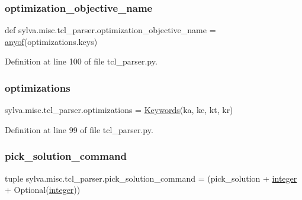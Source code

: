 \subsubsection{\texorpdfstring{optimization\+\_\+objective\+\_\+name}{optimization\_objective\_name}}
{\footnotesize\ttfamily def sylva.\+misc.\+tcl\+\_\+parser.\+optimization\+\_\+objective\+\_\+name = \hyperlink{namespacesylva_1_1misc_1_1tcl__parser_abc9d84dd4132e13b642242dfac628084}{anyof}(optimizations.\+keys)}



Definition at line 100 of file tcl\+\_\+parser.\+py.

\mbox{\label{namespacesylva_1_1misc_1_1tcl__parser_a5a907b434f34bc173db7218151b9f179}} 
\subsubsection{\texorpdfstring{optimizations}{optimizations}}
{\footnotesize\ttfamily sylva.\+misc.\+tcl\+\_\+parser.\+optimizations = \hyperlink{classsylva_1_1misc_1_1tcl__parser_1_1_keywords}{Keywords}(\textquotesingle{}ka\textquotesingle{}, \textquotesingle{}ke\textquotesingle{}, \textquotesingle{}kt\textquotesingle{}, \textquotesingle{}kr\textquotesingle{})}



Definition at line 99 of file tcl\+\_\+parser.\+py.

\mbox{\label{namespacesylva_1_1misc_1_1tcl__parser_aa1c1c65eee0114087b82afaa297507b0}} 
\subsubsection{\texorpdfstring{pick\+\_\+solution\+\_\+command}{pick\_solution\_command}}
{\footnotesize\ttfamily tuple sylva.\+misc.\+tcl\+\_\+parser.\+pick\+\_\+solution\+\_\+command = (pick\+\_\+solution + \hyperlink{namespacesylva_1_1misc_1_1tcl__parser_aaa6da6af48cbfc02e2f6edd078ea16ab}{integer} + Optional(\hyperlink{namespacesylva_1_1misc_1_1tcl__parser_aaa6da6af48cbfc02e2f6edd078ea16ab}{integer}))}



